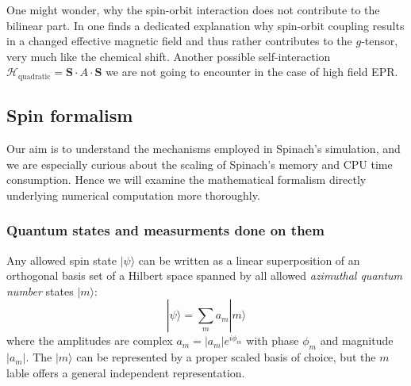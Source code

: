 \documentclass[11.5pt,a4paper]{article}
\begin{document}
  One might wonder, why the spin-orbit interaction does not contribute to the bilinear part. In \cite[chap 11.2, p. 505ff]{slichter} one finds a dedicated explanation why spin-orbit coupling results in a changed effective magnetic field and thus rather contributes to the $g$-tensor, very much like the chemical shift.
  Another possible self-interaction $\mathcal{H}_\text{quadratic} = \mathbf{S} \cdot A \cdot \mathbf{S}$ we are not going to encounter in the case of high field EPR.

\subsection{Spin formalism}
Our aim is to understand the mechanisms employed in Spinach's simulation, and we are especially curious about the scaling of Spinach's memory and CPU time consumption. Hence we will examine the mathematical formalism directly underlying numerical computation more thoroughly.

\subsubsection{Quantum states and measurments done on them}
Any allowed spin state $| \psi \rangle$ can be written as a linear superposition of an orthogonal basis set of a Hilbert  space spanned by all allowed \emph{azimuthal quantum number} states $| m \rangle$:
\begin{equation}
 | \psi \rangle = \sum_m a_m | m \rangle 
\label{eq-orthonormal-basis}
\end{equation}
where the amplitudes are complex $a_m = |a_m| e^{i\phi_m}$ with phase $\phi_m$ and magnitude $|a_m|$. The $|m\rangle$ can be represented by a proper scaled basis of choice, but the $m$ lable offers a general independent representation.
 
\end{document}
